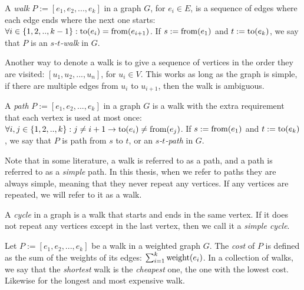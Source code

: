 
\begin{definition}[Walk]
    A \emph{walk} $P := [e_1, e_2, ..., e_k]$ in a graph $G$, for $e_i \in E$, is a sequence of edges where each edge ends where the next one starts: $\forall i \in \{1,2,..,k-1\} : \operatorname{to}(e_i) = \operatorname{from}(e_{i+1})$.
    If $s := \operatorname{from}(e_1)$ and $t := \operatorname{to}(e_k)$, we say that $P$ is an \emph{$s$-$t$-walk} in $G$.
\end{definition}

Another way to denote a walk is to give a sequence of vertices in the order they are visited: $[u_1, u_2, ..., u_n]$, for $u_i \in V$. This works as long as the graph is simple, if there are multiple edges from $u_i$ to $u_{i+1}$, then the walk is ambiguous.

\begin{definition}[Path]
    A \emph{path} $P := [e_1, e_2, ..., e_k]$ in a graph $G$ is a walk with the extra requirement that each vertex is used at most once: $\forall i, j \in \{1,2,..,k\} : j \neq {i+1} \rightarrow \operatorname{to}(e_i) \neq \operatorname{from}(e_j)$.
    If $s := \operatorname{from}(e_1)$ and $t := \operatorname{to}(e_k)$, we say that $P$ is path from $s$ to $t$, or an \emph{$s$-$t$-path} in $G$.
\end{definition}

Note that in some literature, a walk is referred to as a path, and a path is referred to as a \emph{simple} path. In this thesis, when we refer to paths they are always simple, meaning that they never repeat any vertices. If any vertices are repeated, we will refer to it as a walk.    

\begin{definition}[Cycle]
    A \emph{cycle} in a graph is a walk that starts and ends in the same vertex. If it does not repeat any vertices except in the last vertex, then we call it a \emph{simple cycle}.
\end{definition}

\begin{definition}
    Let $P := [e_1, e_2, ..., e_k]$ be a walk in a weighted graph $G$. The \emph{cost} of $P$ is defined as the sum of the weights of its edges: $\sum_{i=1}^k \operatorname{weight}(e_i)$. In a collection of walks, we say that the \emph{shortest} walk is the \emph{cheapest} one, the one with the lowest cost. Likewise for the longest and most expensive walk. 
\end{definition}

